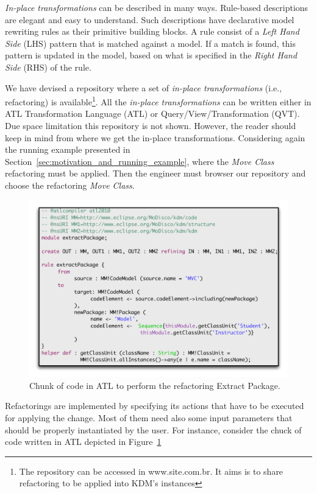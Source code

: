 \textit{In-place transformations} can be described in many ways. Rule-based descriptions are elegant and easy to understand. Such descriptions have declarative model rewriting rules as their primitive building blocks. A rule consist of a \textit{Left Hand Side} (LHS) pattern that is matched against a model. If a match is found, this pattern is updated in the model, based on what is specified in the \textit{Right Hand Side} (RHS) of the rule.

 We have devised a repository where a set of \textit{in-place transformations} (i.e., refactoring) is available\footnote{The repository can be accessed in www.site.com.br. It aims is to share refactoring to be applied into KDM's instances}. All the \textit{in-place transformations} can be written either in ATL Transformation Language (ATL) or Query/View/Transformation (QVT). Due space limitation this repository is not shown. However, the reader should keep in mind from where we get the in-place transformations. Considering again the running example presented in Section~\ref{sec:motivation_and_running_example}, where the \textit{Move Class} refactoring must be applied. Then the engineer must browser our repository and choose the refactoring \textit{Move Class}.

\begin{figure}[h]
	\centering
	\includegraphics[scale=0.47]{figuras/ATLFormatted}
	\caption{Chunk of code in ATL to perform the refactoring Extract Package.}
	\label{fig:ATLRefactoring}
\end{figure}

Refactorings are implemented by specifying its actions that have to be executed for applying the change. Most of them need also some input parameters that should be properly instantiated by the user. For instance, consider the chuck of code written in ATL depicted in Figure~\ref{fig:ATLRefactoring} 








